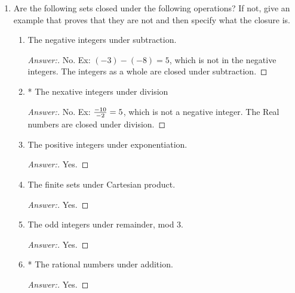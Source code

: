\documentclass[10pt]{article}
\begin{document}
\begin{enumerate}
\addtocounter{enumi}{1}
\item
Are the following sets closed under the following operations?  If not, give an example that proves that they are not and then specify what the closure is.
\begin{enumerate}
\item
The negative integers under subtraction.
\begin{proof}[Answer:]
No.  Ex: $(-3) - (-8) = 5$, which is not in the negative integers.  The integers as a whole are closed under subtraction.
\end{proof}
\item
* The nexative integers under division
\begin{proof}[Answer:]
No.  Ex: ${-10 \over -2} = 5$, which is not a negative integer.  The Real numbers are closed under division.
\end{proof}
\item
The positive integers under exponentiation.
\begin{proof}[Answer:]
Yes.
\end{proof}
\item
The finite sets under Cartesian product.
\begin{proof}[Answer:]
Yes.
\end{proof}
\item
The odd integers under remainder, mod 3.
\begin{proof}[Answer:]
Yes.
\end{proof}
\item
* The rational numbers under addition.
\begin{proof}[Answer:]
Yes.
\end{proof}
\end{enumerate}



\end{enumerate}
\end{document}
